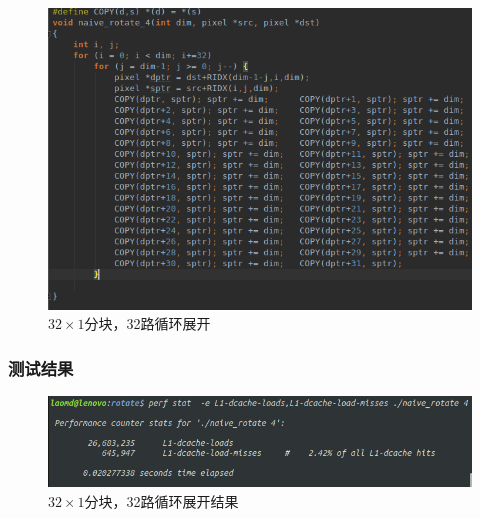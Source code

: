 \documentclass[12pt]{article}
\begin{document}
\begin{figure}[h]
\begin{center}
\includegraphics[width=\textwidth]{c4.png} %
\caption{$32 \times 1$分块，32路循环展开}
\end{center}
\end{figure}

\subsubsection{测试结果}
\begin{figure}[h]
\begin{center}
\includegraphics[width=\textwidth]{p4.png} %
\caption{$32 \times 1$分块，32路循环展开结果}
\end{center}
\end{figure}
\end{document}
